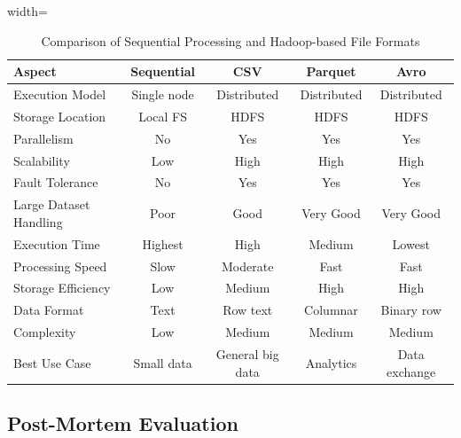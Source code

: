 \documentclass[12pt,a4paper]{report}
\begin{document}
\begin{table}[H]
\centering
\caption{Comparison of Sequential Processing and Hadoop-based File Formats}

\begin{adjustbox}{width=\textwidth}

\begin{tabular}{|l|c|c|c|c|}
\hline

\textbf{Aspect} & \textbf{Sequential} & \textbf{CSV} & \textbf{Parquet} & \textbf{Avro} \\

\hline

Execution Model & Single node & Distributed & Distributed & Distributed \\

Storage Location & Local FS & HDFS & HDFS & HDFS \\

Parallelism & No & Yes & Yes & Yes \\

Scalability & Low & High & High & High \\

Fault Tolerance & No & Yes & Yes & Yes \\

Large Dataset Handling & Poor & Good & Very Good & Very Good \\

Execution Time & Highest & High & Medium & Lowest \\

Processing Speed & Slow & Moderate & Fast & Fast \\

Storage Efficiency & Low & Medium & High & High \\

Data Format & Text & Row text & Columnar & Binary row \\

Complexity & Low & Medium & Medium & Medium \\

Best Use Case & Small data & General big data & Analytics & Data exchange \\

\hline

\end{tabular}

\end{adjustbox}

\end{table}


\subsection{Post-Mortem Evaluation}
\end{document}
